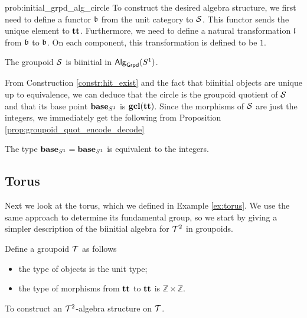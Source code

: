 \begin{construction}{prob:initial_grpd_alg_circle}
To construct the desired algebra structure, we first need to define a functor $\mathfrak{b}$ from the unit category to $\mathcal{S}$.
This functor sends the unique element to $\operatorname{\mathbf{tt}}$.
Furthermore, we need to define a natural transformation $\mathfrak{l}$ from $\mathfrak{b}$ to $\mathfrak{b}$.
On each component, this transformation is defined to be $1$.
\end{construction}

\begin{proposition}
The groupoid $\mathcal{S}$ is biinitial in $\mathsf{Alg}_{\mathsf{Grpd}}(S^1)$.
\end{proposition}

From Construction \ref{constr:hit_exist} and the fact that biinitial objects are unique up to equivalence,
we can deduce that the circle is the groupoid quotient of $\mathcal{S}$ and that its base point $\operatorname{\mathbf{base}}_{S^1}$ is $\operatorname{\mathbf{gcl}}(\operatorname{\mathbf{tt}})$.
Since the morphisms of $\mathcal{S}$ are just the integers, we immediately get the following from Proposition \ref{prop:groupoid_quot_encode_decode}

\begin{corollary}
The type $\operatorname{\mathbf{base}}_{S^1} = \operatorname{\mathbf{base}}_{S^1}$ is equivalent to the integers.
\end{corollary}

\subsection{Torus}
\label{sec:torus_fund_group}
Next we look at the torus, which we defined in Example \ref{ex:torus}.
We use the same approach to determine its fundamental group, so we start by giving a simpler description of the biinitial algebra for $\mathcal{T}^2$ in groupoids.

\begin{definition}
Define a groupoid $\mathcal{T}$ as follows
\begin{itemize}
	\item the type of objects is the unit type;
	\item the type of morphisms from $\operatorname{\mathbf{tt}}$ to $\operatorname{\mathbf{tt}}$ is $\mathbb{Z} \times \mathbb{Z}$.
\end{itemize}
\end{definition}

\begin{problem}
\label{prob:initial_grpd_alg_torus}
To construct an $\mathcal{T}^2$-algebra structure on $\mathcal{T}$.
\end{problem}

